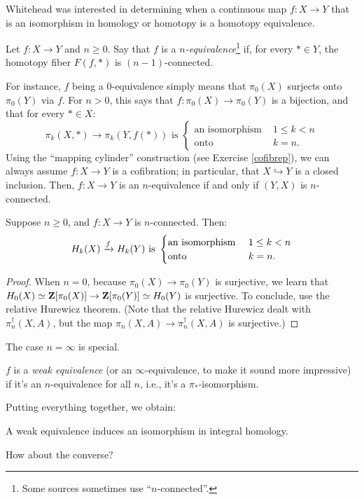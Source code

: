 Whitehead was interested in determining when a continuous map $f:X\to Y$ that is an isomorphism in homology or homotopy
is a homotopy equivalence.
\begin{definition}
    Let $f:X\to Y$ and $n\geq 0$. Say that $f$ is a \emph{$n$-equivalence}\footnote{Some sources sometimes use ``$n$-connected''.}
    if, for every $\ast\in Y$, the homotopy fiber $F(f,\ast)$ is $(n-1)$-connected.
\end{definition}
For instance, $f$ being a $0$-equivalence simply means that $\pi_0(X)$ surjects onto $\pi_0(Y)$ via $f$.
For $n>0$, this says that $f:\pi_0(X)\to \pi_0(Y)$ is a bijection, and that for every $\ast\in X$:
\begin{equation*}
    \pi_k(X,\ast)\to\pi_k(Y,f(\ast)) \text{ is }\begin{cases}
	\text{an isomorphism } & 1\leq k<n\\
	\text{onto } & k = n.
    \end{cases}
\end{equation*}
Using the ``mapping cylinder'' construction (see Exercise \ref{cofibrep}), we can always assume $f:X\to Y$ is a cofibration;
in particular, that $X\hookrightarrow Y$ is a closed inclusion.
Then, $f:X\to Y$ is an $n$-equivalence if and only if $(Y,X)$ is $n$-connected.
\begin{theorem}[Whitehead]
    Suppose $n\geq 0$, and $f:X\to Y$ is $n$-connected. Then:
    \begin{equation*}
	H_k(X)\xrightarrow{{f}} H_k(Y) \text{ is }\begin{cases}
	    \text{an isomorphism } & 1\leq k<n\\
	    \text{onto } & k = n.
	\end{cases}
    \end{equation*}
\end{theorem}
\begin{proof}
    When $n=0$, because $\pi_0(X)\to \pi_0(Y)$ is surjective, we learn that
    $H_0(X)\simeq \mathbf Z[\pi_0(X)]\to \mathbf Z[\pi_0(Y)]\simeq H_0(Y)$ is surjective.
    To conclude, use the relative Hurewicz theorem.
    (Note that the relative Hurewicz dealt with $\pi_n^\dagger(X,A)$, but the map $\pi_n(X,A)\to\pi_n^\dagger(X,A)$ is surjective.)
\end{proof}
The case $n=\infty$ is special.
\begin{definition}
    $f$ is a \emph{weak equivalence} (or an $\infty$-equivalence, to make it sound more impressive) if it's an $n$-equivalence for all $n$, i.e., it's a $\pi_\ast$-isomorphism.
\end{definition}
Putting everything together, we obtain:
\begin{corollary}
    A weak equivalence induces an isomorphism in integral homology.
\end{corollary}
How about the converse?

